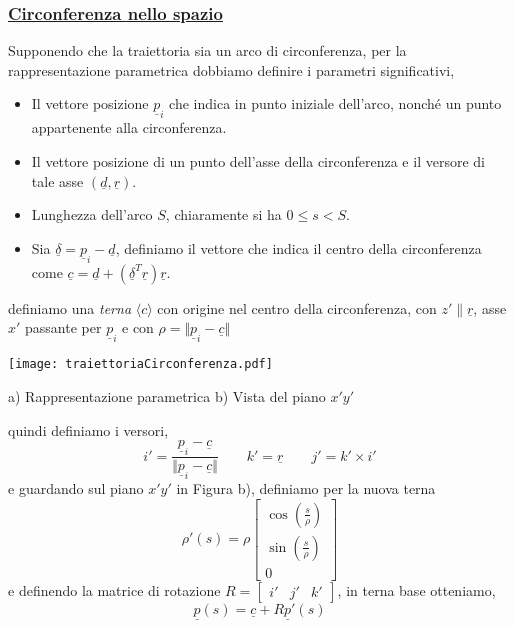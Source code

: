 \subsubsection{\underline{Circonferenza nello spazio}}
Supponendo che la traiettoria sia un arco di circonferenza, per la rappresentazione parametrica dobbiamo definire i parametri significativi,
\begin{itemize}
	\item Il vettore posizione $\underline{p}_i$ che indica in punto iniziale dell'arco, nonché un punto appartenente alla circonferenza.
	\item Il vettore posizione di un punto dell'asse della circonferenza e il versore di tale asse $(\underline{d}, \underline{r})$.
	\item Lunghezza dell'arco $S$, chiaramente si ha $0 \leqslant s < S$.
	\item Sia $\underline{\delta} = \underline{p}_i - \underline{d}$, definiamo il vettore che indica il centro della circonferenza come $\underline{c} = \underline{d} + (\underline{\delta}^T \underline{r})\underline{r}$.
\end{itemize}
definiamo una \emph{terna} $\langle c \rangle$ con origine nel centro della circonferenza, con $z' \parallel \underline{r}$, asse $x'$ passante per $\underline{p}_i$ e con $\rho = \Vert \underline{p}_i - \underline{c} \Vert$ 
\begin{center}
	\texttt{[image: traiettoriaCirconferenza.pdf]}
	\caption{a) Rappresentazione parametrica b) Vista del piano $x'y'$}
\end{center}
quindi definiamo i versori,
\begin{equation}
	i' = \frac{\underline{p}_i - \underline{c}}{\Vert \underline{p}_i - \underline{c}\Vert} \qquad k' = \underline{r} \qquad j' = k' \times i'
\end{equation} 
e guardando sul piano $x'y'$ in Figura b), definiamo per la nuova terna
\begin{equation}
	\rho '(s) = \rho 
	\begin{bmatrix}
		\cos (\frac{s}{\rho}) \\
		\sin (\frac{s}{\rho}) \\
		0
	\end{bmatrix}
\end{equation}
e definendo la matrice di rotazione $R = 
\begin{bmatrix}
	i' & j' & k'
\end{bmatrix} $, in terna base otteniamo,
\begin{equation}
	\underline{p}(s) = \underline{c} + R \underline{p}'(s)
\end{equation}

